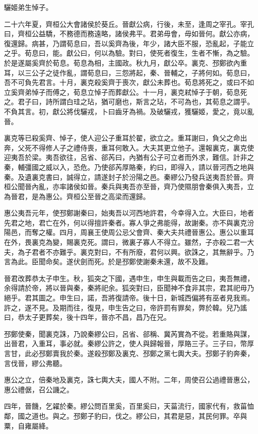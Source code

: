 驪姬弟生悼子。

二十六年夏，齊桓公大會諸侯於葵丘。晉獻公病，行後，未至，逢周之宰孔。宰孔曰，齊桓公益驕，不務德而務遠略，諸侯弗平。君弟毋會，毋如晉何。獻公亦病，復還歸。病甚，乃謂荀息曰，吾以奚齊為後，年少，諸大臣不服，恐亂起，子能立之乎。荀息曰，能。獻公曰，何以為驗。對曰，使死者復生，生者不慚，為之驗。於是遂屬奚齊於荀息。荀息為相，主國政。秋九月，獻公卒。裏克、邳鄭欲內重耳，以三公子之徒作亂，謂荀息曰，三怨將起，秦、晉輔之，子將何如。荀息曰，吾不可負先君言。十月，裏克殺奚齊于喪次，獻公未葬也。荀息將死之，或曰不如立奚齊弟悼子而傅之，荀息立悼子而葬獻公。十一月，裏克弒悼子于朝，荀息死之。君子曰，詩所謂白珪之玷，猶可磨也，斯言之玷，不可為也，其荀息之謂乎。不負其言。初，獻公將伐驪戎，卜曰齒牙為禍。及破驪戎，獲驪姬，愛之，竟以亂晉。

裏克等已殺奚齊、悼子，使人迎公子重耳於翟，欲立之。重耳謝曰，負父之命出奔，父死不得修人子之禮侍喪，重耳何敢入。大夫其更立他子。還報裏克，裏克使迎夷吾於梁。夷吾欲往，呂省、郤芮曰，內猶有公子可立者而外求，難信。計非之秦，輔彊國之威以入，恐危。乃使郤芮厚賂秦，約曰，即得入，請以晉河西之地與秦。及遺裏克書曰，誠得立，請遂封子於汾陽之邑。秦繆公乃發兵送夷吾於晉。齊桓公聞晉內亂，亦率諸侯如晉。秦兵與夷吾亦至晉，齊乃使隰朋會秦俱入夷吾，立為晉君，是為惠公。齊桓公至晉之高梁而還歸。

惠公夷吾元年，使邳鄭謝秦曰，始夷吾以河西地許君，今幸得入立。大臣曰，地者先君之地，君亡在外，何以得擅許秦者。寡人爭之弗能得，故謝秦。亦不與裏克汾陽邑，而奪之權。四月，周襄王使周公忌父會齊、秦大夫共禮晉惠公。惠公以重耳在外，畏裏克為變，賜裏克死。謂曰，微裏子寡人不得立。雖然，子亦殺二君一大夫，為子君者不亦難乎。裏克對曰，不有所廢，君何以興。欲誅之，其無辭乎。乃言為此。臣聞命矣。遂伏劍而死。於是邳鄭使謝秦未還，故不及難。

晉君改葬恭太子申生。秋，狐突之下國，遇申生，申生與載而告之曰，夷吾無禮，余得請於帝，將以晉與秦，秦將祀余。狐突對曰，臣聞神不食非其宗，君其祀毋乃絕乎。君其圖之。申生曰，諾，吾將復請帝。後十日，新城西偏將有巫者見我焉。許之，遂不見。及期而往，復見，申生告之曰，帝許罰有罪矣，弊於韓。兒乃謠曰，恭太子更葬矣，後十四年，晉亦不昌，昌乃在兄。

邳鄭使秦，聞裏克誅，乃說秦繆公曰，呂省、郤稱、冀芮實為不從。若重賂與謀，出晉君，入重耳，事必就。秦繆公許之，使人與歸報晉，厚賂三子。三子曰，幣厚言甘，此必邳鄭賣我於秦。遂殺邳鄭及裏克、邳鄭之黨七輿大夫。邳鄭子豹奔秦，言伐晉，繆公弗聽。

惠公之立，倍秦地及裏克，誅七輿大夫，國人不附。二年，周使召公過禮晉惠公，惠公禮倨，召公譏之。

四年，晉饑，乞糴於秦。繆公問百里奚，百里奚曰，天菑流行，國家代有，救菑恤鄰，國之道也。與之。邳鄭子豹曰，伐之。繆公曰，其君是惡，其民何罪。卒與粟，自雍屬絳。

